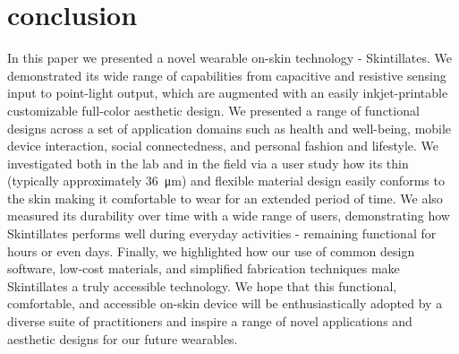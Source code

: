 \documentclass{sigchi}
\begin{document}
\section {conclusion}
In this paper we presented a novel wearable on-skin technology - Skintillates.  We demonstrated its wide range of capabilities from capacitive and resistive sensing input to point-light output, which are augmented with an easily inkjet-printable customizable full-color aesthetic design.  We presented a range of functional designs across a set of application domains such as health and well-being, mobile device interaction, social connectedness, and personal fashion and lifestyle. We investigated both in the lab and in the field via a user study how its thin (typically approximately 36\SI{}{\micro\metre}) and flexible material design easily conforms to the skin making it comfortable to wear for an extended period of time. We also measured its durability over time with a wide range of users, demonstrating how Skintillates performs well during everyday activities - remaining functional for hours or even days. Finally, we highlighted how our use of common design software, low-cost materials, and simplified fabrication techniques make Skintillates a truly accessible technology.  We hope that this functional, comfortable, and accessible on-skin device will be enthusiastically adopted by a diverse suite of practitioners and inspire a range of novel applications and aesthetic designs for our future wearables.







%
%
%
%
%
\balance



\end{document}
